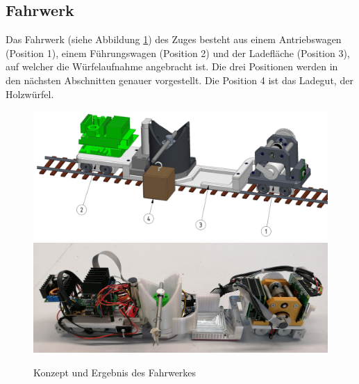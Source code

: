 \documentclass[../../main.tex]{subfiles}
\begin{document}

\subsection{Fahrwerk} \label{mt_Fahrwerk}

Das Fahrwerk (siehe Abbildung \ref{fig:konzeptfahrwerk}) des Zuges besteht aus einem Antriebswagen (Position 1), einem Führungswagen (Position 2) und der Ladefläche (Position 3), auf welcher die Würfelaufnahme angebracht ist. Die drei Positionen werden in den nächsten Abschnitten genauer vorgestellt. Die Position 4 ist das Ladegut, der Holzwürfel.\\

\begin{figure}[H]
   \centering
   \includegraphics[width=.95\textwidth]{../../images/Maschinentechnik/lokomotive.PNG}
   \includegraphics[width=.95\textwidth]{../../images/Maschinentechnik/lokomotive2.PNG}
   \caption {Konzept und Ergebnis des Fahrwerkes}
   \label{fig:konzeptfahrwerk}
\end{figure}
\end{document}
